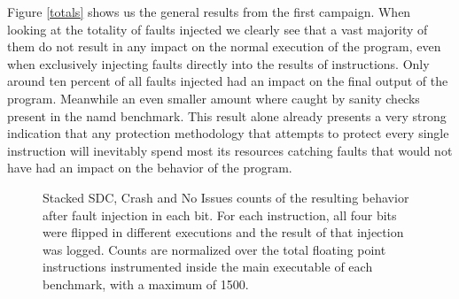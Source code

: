 \documentclass[lettersize,journal]{IEEEtran}
\begin{document}
Figure \ref{totals} shows us the general results from the first campaign. When looking at the totality of faults injected we clearly see that a vast majority of them do not result in any impact on the normal execution of the program, even when exclusively injecting faults directly into the results of instructions. Only around ten percent of all faults injected had an impact on the final output of the program. Meanwhile an even smaller amount where caught by sanity checks present in the namd benchmark. This result alone already presents a very strong indication that any protection methodology that attempts to protect every single instruction will inevitably spend most its resources catching faults that would not have had an impact on the behavior of the program.\\
\begin{figure}[!t] 
    \centering
    \hspace{0mm}
\caption{Stacked SDC, Crash and No Issues counts of the resulting behavior after fault injection in each bit. For each instruction, all four bits were flipped in different executions and the result of that injection was logged. Counts are normalized over the total floating point instructions instrumented inside the main executable of each benchmark, with a maximum of 1500.}
\label{perbits}
\end{figure}
\end{document}
